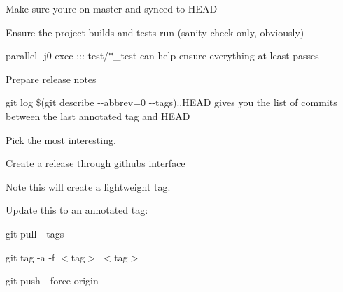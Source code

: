 
\begin{DoxyItemize}
\item Make sure you\textquotesingle{}re on master and synced to H\+E\+AD
\item Ensure the project builds and tests run (sanity check only, obviously)
\begin{DoxyItemize}
\item {\ttfamily parallel -\/j0 exec \+::\+: test/$\ast$\+\_\+test} can help ensure everything at least passes
\end{DoxyItemize}
\item Prepare release notes
\begin{DoxyItemize}
\item {\ttfamily git log \$(git describe -\/-\/abbrev=0 -\/-\/tags)..H\+E\+AD} gives you the list of commits between the last annotated tag and H\+E\+AD
\item Pick the most interesting.
\end{DoxyItemize}
\item Create a release through github\textquotesingle{}s interface
\begin{DoxyItemize}
\item Note this will create a lightweight tag.
\item Update this to an annotated tag\+:
\begin{DoxyItemize}
\item {\ttfamily git pull -\/-\/tags}
\item {\ttfamily git tag -\/a -\/f $<$tag$>$ $<$tag$>$}
\item {\ttfamily git push -\/-\/force origin} 
\end{DoxyItemize}
\end{DoxyItemize}
\end{DoxyItemize}